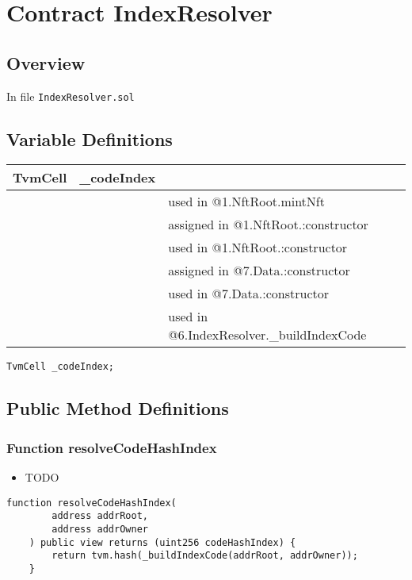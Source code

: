 
\chapter{Contract IndexResolver}

\minitoc

\section{Overview}


In file {\tt IndexResolver.sol}

\section{Variable Definitions}


\ifsoltables
\noindent\begin{tabular}{|l|l|p{5cm}|}\hline
TvmCell & \_{}codeIndex &  \\\hline
 & & used in @1.NftRoot.mintNft\\\hline
 & & assigned in @1.NftRoot.:constructor\\\hline
 & & used in @1.NftRoot.:constructor\\\hline
 & & assigned in @7.Data.:constructor\\\hline
 & & used in @7.Data.:constructor\\\hline
 & & used in @6.IndexResolver.\_{}buildIndexCode\\\hline
\end{tabular}
\fi


\begin{lstlisting}[firstnumber=11]
    TvmCell _codeIndex;
\end{lstlisting}

\section{Public Method Definitions}


\subsection{Function resolveCodeHashIndex}

\begin{itemize}
\item TODO
\end{itemize}

\begin{lstlisting}[firstnumber=13]
    function resolveCodeHashIndex(
        address addrRoot,
        address addrOwner
    ) public view returns (uint256 codeHashIndex) {
        return tvm.hash(_buildIndexCode(addrRoot, addrOwner));
    }
\end{lstlisting}

